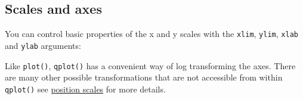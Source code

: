 \subsection{Scales and axes}

You can control basic properties of the x and y scales with the
\texttt{xlim}, \texttt{ylim}, \texttt{xlab} and \texttt{ylab} arguments:

\begin{Shaded}
\begin{Highlighting}[]
  \NormalTok{(}\NormalTok{, }\NormalTok{), } \NormalTok{)}
\StringTok{ }\NormalTok{() +}\StringTok{ }
\StringTok{  }\NormalTok{(}\NormalTok{, } \NormalTok{(}\NormalTok{, }\NormalTok{))}

  \NormalTok{(}\NormalTok{, }\NormalTok{), } \NormalTok{(}\NormalTok{, }\NormalTok{))}
\StringTok{ }\NormalTok{() +}\StringTok{ }
\StringTok{  }\NormalTok{(} \NormalTok{(}\NormalTok{, }\NormalTok{))}
  \NormalTok{(} \NormalTok{(}\NormalTok{, }\NormalTok{))}
\end{Highlighting}
\end{Shaded}

Like \texttt{plot()}, \texttt{qplot()} has a convenient way of log
transforming the axes. There are many other possible transformations
that are not accessible from within \texttt{qplot()} see
\hyperref[sub:scale-position]{position scales} for more details.

\begin{Shaded}
\begin{Highlighting}[]
  \NormalTok{)}
\StringTok{ }\NormalTok{() +}\StringTok{ }
\StringTok{  }\NormalTok{() +}\StringTok{ }\NormalTok{()}
\end{Highlighting}
\end{Shaded}

